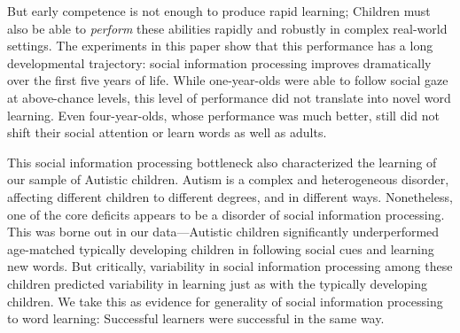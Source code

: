 \documentclass{pnastwo}
\begin{document}
\begin{article}
But early competence is not enough to produce rapid learning; Children must also be able to \emph{perform} these abilities rapidly and robustly in complex real-world settings. The experiments in this paper show that this performance has a long developmental trajectory: social information processing improves dramatically over the first five years of life. While one-year-olds were able to follow social gaze at above-chance levels, this level of performance did not translate into novel word learning. Even four-year-olds, whose performance was much better, still did not shift their social attention or learn words as well as adults. 

This social information processing bottleneck also characterized the learning of our sample of Autistic children. Autism is a complex and heterogeneous disorder, affecting different children to different degrees, and in different ways. Nonetheless, one of the core deficits appears to be a disorder of social information processing. This was borne out in our data---Autistic children significantly underperformed age-matched typically developing children in following social cues and learning new words. But critically, variability in social information processing among these children predicted variability in learning just as with the typically developing children.  We take this as evidence for generality of social information processing to word learning: Successful learners were successful in the same way.



%
%
%
%
%
%
%




\end{article}
\end{document}
